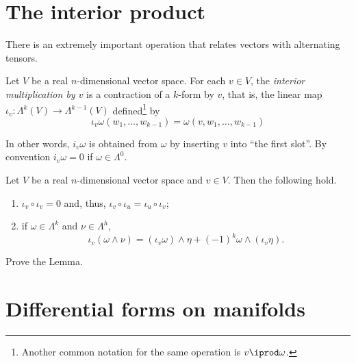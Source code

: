 \section{The interior product}

There is an extremely important operation that relates vectors with alternating tensors.

\begin{definition}
  Let $V$ be a real $n$-dimensional vector space.
  For each $v\in V$, the \emph{interior multiplication by $v$} is a contraction of a $k$-form by $v$, that is, the linear map $\iota_v:\Lambda^{k}(V)\to \Lambda^{k-1}(V)$ defined\footnote{Another common notation for the same operation is $v \iprod \omega$.} by
  \begin{equation}
    \iota_v\omega(w_1,\ldots,w_{k-1}) = \omega(v,w_1,\ldots,w_{k-1})
  \end{equation}
\end{definition}

In other words, $i_v\omega$ is obtained from $\omega$ by inserting $v$ into ``the first slot''.
By convention $i_v\omega = 0$ if $\omega\in\Lambda^0$.

\begin{lemma}
  Let $V$ be a real $n$-dimensional vector space and $v\in V$.
  Then the following hold.
  \begin{enumerate}
    \item $\iota_v\circ \iota_v = 0$ and, thus, $\iota_v\circ\iota_u = \iota_u\circ\iota_v$;
    \item if $\omega\in\Lambda^k$ and $\nu\in\Lambda^h$,
    \begin{equation}
      \iota_v(\omega\wedge\nu) = (\iota_v\omega)\wedge\eta + {(-1)}^k\omega\wedge(\iota_v\eta).
    \end{equation}
  \end{enumerate}
\end{lemma}
\begin{exercise}
  Prove the Lemma.
\end{exercise}

\section{Differential forms on manifolds}

